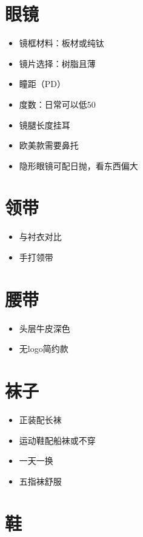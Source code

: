 \documentclass[
  letterpaper,
  DIV=11,
  numbers=noendperiod]{scrreprt}
\providecommand{\tightlist}{%
  \setlength{\itemsep}{0pt}\setlength{\parskip}{0pt}}\usepackage{longtable,booktabs,array}
\begin{document}
\section{眼镜}\label{ux773cux955c}

\begin{itemize}
\tightlist
\item
  镜框材料：板材或纯钛
\item
  镜片选择：树脂且薄
\item
  瞳距（PD）
\item
  度数：日常可以低50
\item
  镜腿长度挂耳
\item
  欧美款需要鼻托
\item
  隐形眼镜可配日抛，看东西偏大
\end{itemize}

\section{领带}\label{ux9886ux5e26}

\begin{itemize}
\tightlist
\item
  与衬衣对比
\item
  手打领带
\end{itemize}

\section{腰带}\label{ux8170ux5e26}

\begin{itemize}
\tightlist
\item
  头层牛皮深色
\item
  无logo简约款
\end{itemize}

\section{袜子}\label{ux889cux5b50}

\begin{itemize}
\tightlist
\item
  正装配长袜
\item
  运动鞋配船袜或不穿
\item
  一天一换
\item
  五指袜舒服
\end{itemize}

\section{鞋}\label{ux978b}
\end{document}
